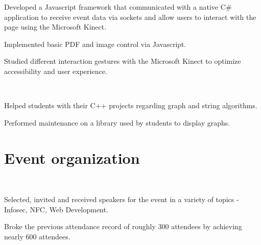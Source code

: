\documentclass[letterpaper]{deedy-resume} %
\begin{document}
\begin{minipage}[t]{0.66\textwidth}
\sectionspace %



\begin{tightitemize}
\item Developed a Javascript framework that communicated with a native C\# application to receive event data via sockets and allow users to interact with the page using the Microsoft Kinect.
\item Implemented basic PDF and image control via Javascript.
\item Studied different interaction gestures with the Microsoft Kinect to optimize accessibility and user experience.
\end{tightitemize}

\sectionspace %


 \\

\begin{tightitemize}
\item Helped students with their C++ projects regarding graph and string algorithms.
\item Performed maintenance on a library used by students to display graphs.
\end{tightitemize}

\sectionspace %


\section{Event organization}

 \\

\begin{tightitemize}
\item Selected, invited and received speakers for the event in a variety of topics - Infosec, NFC, Web Development.
\item Broke the previous attendance record of roughly 300 attendees by achieving nearly 600 attendees.
\end{tightitemize}


\end{minipage}
\end{document}
